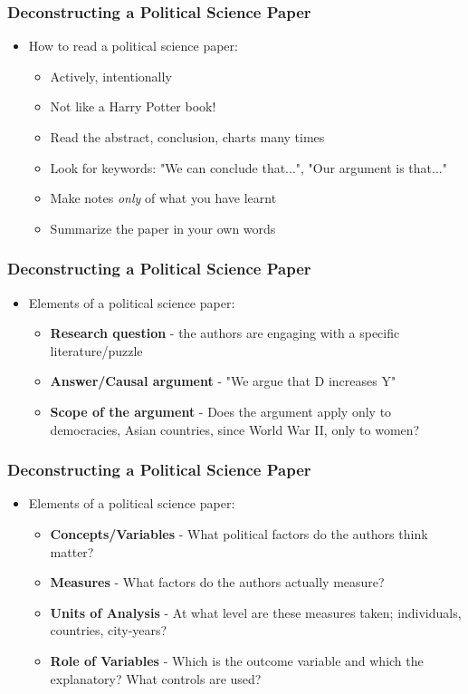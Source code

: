 \documentclass[xcolor=x11names,compress]{beamer}\usepackage[]{graphicx}\usepackage[]{xcolor}
\renewcommand{\(}{\begin{columns}}
\renewcommand{\)}{\end{columns}}
\newcommand{\<}[1]{\begin{column}{#1}}
\renewcommand{\>}{\end{column}}
\begin{document}
\begin{frame}
\frametitle{Deconstructing a Political Science Paper}
\begin{itemize}
\item How to read a political science paper:
\pause
\begin{itemize}
\item Actively, intentionally
\pause
\item Not like a Harry Potter book!
\pause
\item Read the abstract, conclusion, charts many times
\pause
\item Look for keywords: "We can conclude that...", "Our argument is that..."
\pause
\item Make notes \textit{only} of what you have learnt
\pause
\item Summarize the paper in your own words
\end{itemize}
\end{itemize}
\end{frame}

\begin{frame}
\frametitle{Deconstructing a Political Science Paper}
\begin{itemize}
\item Elements of a political science paper:
\pause
\begin{itemize}
\item \textbf{Research question} - the authors are engaging with a specific literature/puzzle
\pause
\item \textbf{Answer/Causal argument} - "We argue that D increases Y"
\pause
\item \textbf{Scope of the argument} - Does the argument apply only to democracies, Asian countries, since World War II, only to women?
\end{itemize}
\end{itemize}
\end{frame}

\begin{frame}
\frametitle{Deconstructing a Political Science Paper}
\begin{itemize}
\item Elements of a political science paper:
\begin{itemize}
\item \textbf{Concepts/Variables} - What political factors do the authors think matter?
\pause
\item \textbf{Measures} - What factors do the authors actually measure?
\pause
\item \textbf{Units of Analysis} - At what level are these measures taken; individuals, countries, city-years?
\pause
\item \textbf{Role of Variables} - Which is the outcome variable and which the explanatory? What controls are used?
\end{itemize}
\end{itemize}
\end{frame}
\end{document}
